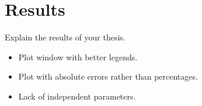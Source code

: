 \chapter{Results}

Explain the results of your thesis.

\begin{itemize}
    \item Plot window with better legends.
    \item Plot with absolute errors rather than percentages.
    \item Lack of independent parameters.
\end{itemize}